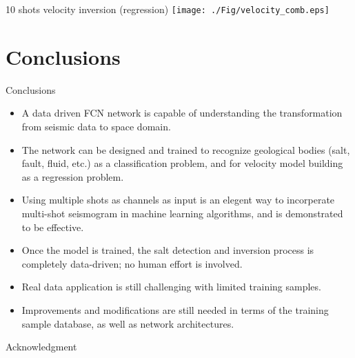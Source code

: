 \documentclass[aspectratio=169]{beamer}
\begin{document}
\begin{frame}{10 shots velocity inversion (regression)}
\centering
 \texttt{[image: ./Fig/velocity\_comb.eps]}
\end{frame}
\section{Conclusions}
\begin{frame}{Conclusions}
\begin{itemize}
\item{A data driven FCN network is capable of understanding the transformation from seismic data to space domain.}
\item{The network can be designed and trained to recognize geological bodies (salt, fault, fluid, etc.) as a classification problem, and for velocity model building as a regression problem.}
\item{Using multiple shots as channels as input is an elegent way to incorperate multi-shot seismogram in machine learning algorithms, and is demonstrated to be effective.}
\item{Once the model is trained, the salt detection and inversion process is completely data-driven; no human effort is involved.}
\item{Real data application is still challenging with limited training samples.}
\item{Improvements and modifications are still needed in terms of the training sample database, as well as network architectures.}
\end{itemize}
\end{frame}
\begin{frame}{Acknowledgment}
\end{frame}


\end{document}
